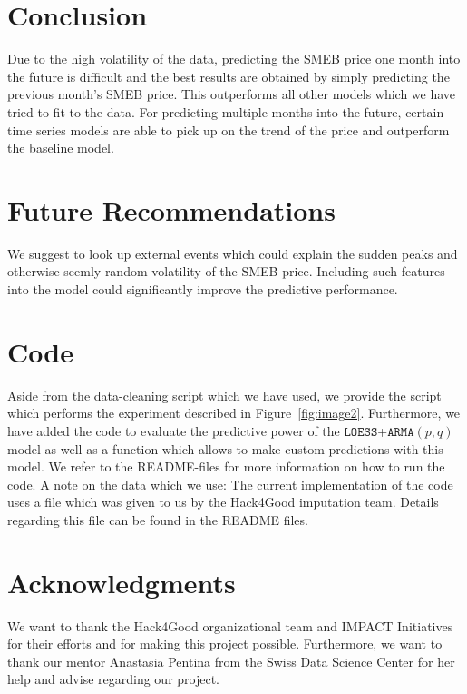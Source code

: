 \documentclass[11pt,a4paper]{article}
\begin{document}
	\section*{Conclusion}
	Due to the high volatility of the data, predicting the SMEB price one month into the future is difficult and the best results are obtained by simply predicting the previous month's SMEB price. This outperforms all other models which we have tried to fit to the data. For predicting multiple months into the future, certain time series models are able to pick up on the trend of the price and outperform the baseline model.
	
	\section*{Future Recommendations}
	We suggest to look up external events which could explain the sudden peaks and otherwise seemly random volatility of the SMEB price. Including such features into the model could significantly improve the predictive performance.
	
	\section*{Code}
	Aside from the data-cleaning script which we have used, we provide the script which performs the experiment described in Figure~\ref{fig:image2}. Furthermore, we have added the code to evaluate the predictive power of the $\mathtt{LOESS}$+$\mathtt{ARMA}(p,q)$ model as well as a function which allows to make custom predictions with this model. We refer to the README-files for more information on how to run the code. A note on the data which we use: The current implementation of the code uses a file which was given to us by the Hack4Good imputation team. Details regarding this file can be found in the README files.
	
	\section*{Acknowledgments}
	We want to thank the Hack4Good organizational team and IMPACT Initiatives for their efforts and for making this project possible. Furthermore, we want to thank our mentor Anastasia Pentina from the Swiss Data Science Center for her help and advise regarding our project.
\end{document}
